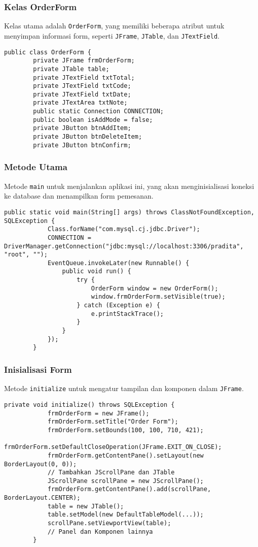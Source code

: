 \subsubsection{Kelas OrderForm}
Kelas utama adalah \texttt{OrderForm}, yang memiliki beberapa atribut untuk menyimpan informasi form, seperti \texttt{JFrame}, \texttt{JTable}, dan \texttt{JTextField}.

\begin{lstlisting}[style=javaStyle]
	public class OrderForm {
		private JFrame frmOrderForm;
		private JTable table;
		private JTextField txtTotal;
		private JTextField txtCode;
		private JTextField txtDate;
		private JTextArea txtNote;
		public static Connection CONNECTION;
		public boolean isAddMode = false;
		private JButton btnAddItem;
		private JButton btnDeleteItem;
		private JButton btnConfirm;
\end{lstlisting}
	
\subsubsection{Metode Utama}
Metode \texttt{main} untuk menjalankan aplikasi ini, yang akan menginisialisasi koneksi ke database dan menampilkan form pemesanan.
	
\begin{lstlisting}[style=javaStyle]
		public static void main(String[] args) throws ClassNotFoundException, SQLException {
			Class.forName("com.mysql.cj.jdbc.Driver");
			CONNECTION = DriverManager.getConnection("jdbc:mysql://localhost:3306/pradita", "root", "");
			EventQueue.invokeLater(new Runnable() {
				public void run() {
					try {
						OrderForm window = new OrderForm();
						window.frmOrderForm.setVisible(true);
					} catch (Exception e) {
						e.printStackTrace();
					}
				}
			});
		}
\end{lstlisting}
	
\subsubsection{Inisialisasi Form}
Metode \texttt{initialize} untuk mengatur tampilan dan komponen dalam \texttt{JFrame}.
	
\begin{lstlisting}[style=javaStyle]
		private void initialize() throws SQLException {
			frmOrderForm = new JFrame();
			frmOrderForm.setTitle("Order Form");
			frmOrderForm.setBounds(100, 100, 710, 421);
			frmOrderForm.setDefaultCloseOperation(JFrame.EXIT_ON_CLOSE);
			frmOrderForm.getContentPane().setLayout(new BorderLayout(0, 0));
			// Tambahkan JScrollPane dan JTable
			JScrollPane scrollPane = new JScrollPane();
			frmOrderForm.getContentPane().add(scrollPane, BorderLayout.CENTER);
			table = new JTable();
			table.setModel(new DefaultTableModel(...));
			scrollPane.setViewportView(table);
			// Panel dan Komponen lainnya
		}
\end{lstlisting}
	
